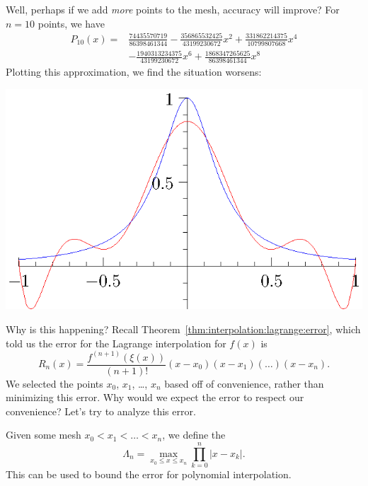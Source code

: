 \begin{ex}[Runge phenomena]
  Well, perhaps if we add \emph{more} points to the mesh, accuracy will
  improve? For $n=10$ points, we have
  \begin{equation}
    \begin{split}
    P_{10}(x) =& \frac{74435570719}{86398461344}
    -\frac{356865532425}{43199230672} x^2
    +\frac{331862214375}{10799807668} x^4\\
    &-\frac{1940313234375}{43199230672} x^6
    +\frac{1868347265625}{86398461344} x^8
    \end{split}
  \end{equation}
  Plotting this approximation, we find the situation worsens:
  \begin{center}
    \includegraphics{img/chebyshev2.eps}
  \end{center}
  Why is this happening? Recall Theorem~\ref{thm:interpolation:lagrange:error},
  which told us the error for the Lagrange interpolation for $f(x)$ is
  \begin{equation}
    R_{n}(x) = \frac{f^{(n+1)}(\xi(x))}{(n+1)!}(x-x_{0})(x-x_{1})(\dots)(x-x_{n}).
  \end{equation}
  We selected the points $x_{0}$, $x_{1}$, \dots, $x_{n}$ based off of
  convenience, rather than minimizing this error. Why would we expect
  the error to respect our convenience? Let's try to analyze this error.
\end{ex}

\begin{defn}
  Given some mesh $x_{0}<x_{1}<\dots<x_{n}$, we define the
  \begin{equation}
    \Lambda_{n} = \max_{x_{0}\leq x\leq x_{n}}\prod^{n}_{k=0}|x-x_{k}|.
  \end{equation}
  This can be used to bound the error for polynomial interpolation.
\end{defn}

